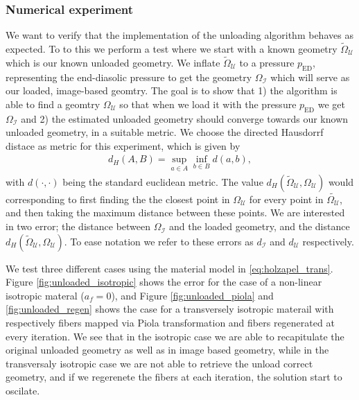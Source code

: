 \subsubsection{Numerical experiment}
We want to verify that the implementation of the unloading algorithm
behaves as expected. To to this we perform a test where we start with
a known geometry $\tilde{\Omega}_{\mathcal{U}}$ which is our known
unloaded geometry. We inflate $\tilde{\Omega}_{\mathcal{U}}$ to a
pressure $p_{\mathrm{ED}}$, representing the end-diasolic pressure to
get the geometry $\Omega_{\mathcal{I}}$ which will serve as our loaded,
image-based geomtry. The goal is to show that 1) the algorithm is able
to find a geomtry $\Omega_{\mathcal{U}}$ so that when we load it with
the pressure $p_{\mathrm{ED}}$ we get $\Omega_{\mathcal{I}}$ and 2)
the estimated unloaded geometry should converge towards our known
unloaded geometry, in a suitable metric. We choose the directed
Hausdorrf distace \cite{huttenlocher1993comparing} as metric for this
experiment, which is given by
\begin{align}
  d_H(A, B) = \sup_{a \in A} \inf_{b \in B} d(a,b), 
\end{align}
with $d(\cdot, \cdot)$ being the standard euclidean metric. 
The value $d_H(\tilde{\Omega}_{\mathcal{U}}, \Omega_{\mathcal{U}})$
would corresponding to first finding the the closest point in $\Omega_{\mathcal{U}}$ 
for every point in $\tilde{\Omega_{\mathcal{U}}}$, and then taking the
maximum distance between these points. We are interested in two error;
the distance between $\Omega_{\mathcal{I}}$ and the loaded geometry,
and the distance $d_H(\tilde{\Omega}_{\mathcal{U}},
\Omega_{\mathcal{U}})$. To ease notation we refer to these errors as
$d_{\mathcal{I}}$ and $d_{\mathcal{U}}$ respectively.


We test three different cases using the material model in \eqref{eq:holzapel_trans}.
Figure \ref{fig:unloaded_isotropic} shows the error for the case of a
non-linear isotropic materal ($a_f = 0$), and Figure
\ref{fig:unloaded_piola} and \ref{fig:unloaded_regen} shows the case
for a transversely isotropic materail with respectively fibers mapped
via Piola transformation and fibers regenerated at every iteration.
We see that in the isotropic case we are able to recapitulate the
original unloaded geometry as well as in image based geometry, while
in the transversaly isotropic case we are not able to retrieve the
unload correct geometry, and if we regerenete the fibers at each
iteration, the solution start to oscilate. 


